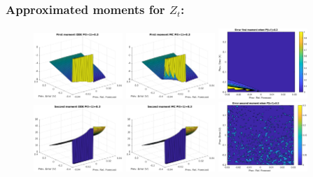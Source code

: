 \documentclass[aspectratio=169]{beamer}\usepackage[utf8]{inputenc}
\begin{document}
\begin{frame}\frametitle{Approximated moments for $Z_t$:}

\begin{figure}[ht!]
\centering
\includegraphics[width=0.3\textwidth]{../../MATLAB_Files/Results/moments/lamperti/errors/fm_ODE_2.eps}\quad
\includegraphics[width=0.3\textwidth]{../../MATLAB_Files/Results/moments/lamperti/errors/fm_MC_2.eps}\quad
\includegraphics[width=0.3\textwidth]{../../MATLAB_Files/Results/moments/lamperti/errors/fm_2.eps}\quad
\includegraphics[width=0.3\textwidth]{../../MATLAB_Files/Results/moments/lamperti/errors/sm_ODE_2.eps}\quad
\includegraphics[width=0.3\textwidth]{../../MATLAB_Files/Results/moments/lamperti/errors/sm_MC_2.eps}\quad
\includegraphics[width=0.3\textwidth]{../../MATLAB_Files/Results/moments/lamperti/errors/sm_2.eps}
\end{figure}

\end{frame}
\end{document}
